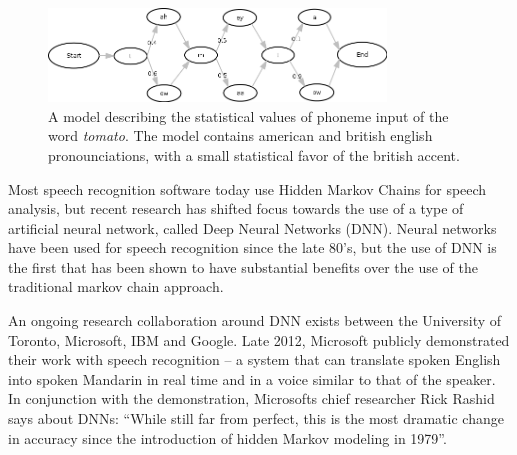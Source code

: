 \begin{figure}[]
\includegraphics[width=0.8\textwidth] {bilder/tomato.jpg}
\caption{A model describing the statistical values of phoneme input of the word \emph{tomato}. The model contains american and british english pronounciations, with a small statistical favor of the british accent.}
\label{ibooks}
\end{figure}

Most speech recognition software today use Hidden Markov Chains for speech analysis\cite{DNN}, but recent research has shifted focus towards the use of a type of artificial neural network, called Deep Neural Networks (DNN). Neural networks have been used for speech recognition since the late 80's, but the use of DNN is the first that has been shown to have substantial benefits over the use of the traditional markov chain approach.

An ongoing research collaboration around DNN exists between the University of Toronto, Microsoft, IBM and Google. Late 2012, Microsoft publicly demonstrated their work with speech recognition -- a system that can translate spoken English into spoken Mandarin in real time and in a voice similar to that of the speaker. In conjunction with the demonstration, Microsofts chief researcher Rick Rashid says about DNNs: ``While still far from perfect, this is the most dramatic change in accuracy since the introduction of hidden Markov modeling in 1979''\cite{chin}.


